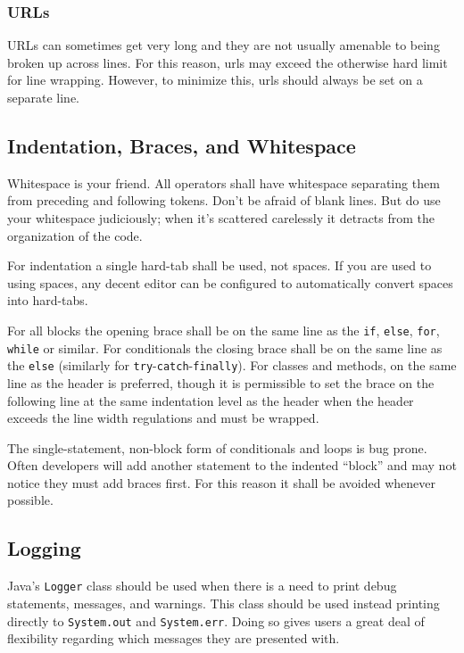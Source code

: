 \subsubsection{URLs}
URLs can sometimes get very long and they are not usually amenable to being broken up across lines. For this reason, urls may exceed the otherwise hard limit for line wrapping. However, to minimize this, urls should always be set on a separate line. 


\subsection{Indentation, Braces, and Whitespace}

Whitespace is your friend. All operators shall have whitespace separating them from preceding and following tokens. Don't be afraid of blank lines. But do use your whitespace judiciously; when it's scattered carelessly it detracts from the organization of the code.

For indentation a single hard-tab shall be used, not spaces. If you are used to using spaces, any decent editor can be configured to automatically convert spaces into hard-tabs.

For all blocks the opening brace shall be on the same line as the {\tt if}, {\tt else}, {\tt for}, {\tt while} or similar. For conditionals the closing brace shall be on the same line as the {\tt else} (similarly for {\tt try}-{\tt catch}-{\tt finally}). For classes and methods, on the same line as the header is preferred, though it is permissible to set the brace on the following line at the same indentation level as the header when the header exceeds the line width regulations and must be wrapped.

The single-statement, non-block form of conditionals and loops is bug prone. Often developers will add another statement to the indented ``block'' and may not notice they must add braces first. For this reason it shall be avoided whenever possible. 


\subsection{Logging}

Java's {\tt Logger} class should be used when there is a need to print debug statements, messages, and warnings. This class should be used instead printing directly to {\tt System.out} and {\tt System.err}. Doing so gives users a great deal of flexibility regarding which messages they are presented with.

